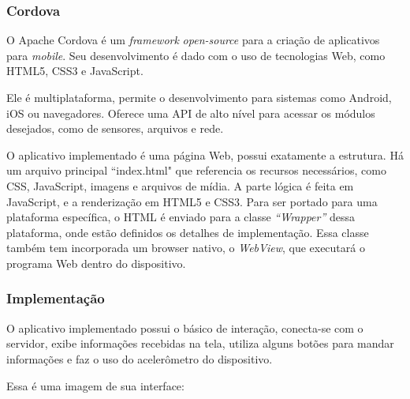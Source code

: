 \documentclass[a4paper,12pt]{article}
\begin{document}
\subsubsection{Cordova}

O Apache Cordova é um \emph{framework} \emph{open-source} para a criação de aplicativos para \emph{mobile}. Seu desenvolvimento é dado com o uso de tecnologias Web, como HTML5, CSS3 e JavaScript.

Ele é multiplataforma, permite o desenvolvimento para sistemas como Android, iOS ou navegadores. Oferece uma API de alto nível para acessar os módulos desejados, como de sensores, arquivos e rede.

O aplicativo implementado é uma página Web, possui exatamente a estrutura. Há um arquivo principal “index.html" que referencia os recursos necessários, como CSS, JavaScript, imagens e arquivos de mídia. A parte lógica é feita em JavaScript, e a renderização em HTML5 e CSS3. Para ser portado para uma plataforma específica, o HTML é enviado para a classe \emph{“Wrapper”} dessa plataforma, onde estão definidos os detalhes de implementação. Essa classe também tem incorporada um browser nativo, o \emph{WebView}, que executará o programa Web dentro do dispositivo.

\subsubsection{Implementação}

O aplicativo implementado possui o básico de interação, conecta-se com o servidor, exibe informações recebidas na tela, utiliza alguns botões para mandar informações e faz o uso do acelerômetro do dispositivo.

Essa é uma imagem de sua interface:
\end{document}
